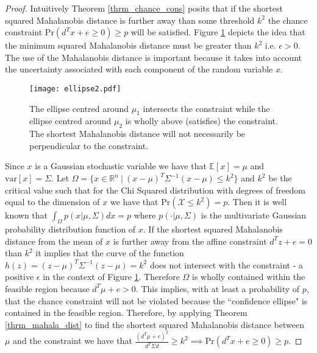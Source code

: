 \begin{proof}
Intuitively Theorem \ref{thrm_chance_cons} posits that if the shortest squared Mahalanobis distance is further away than some threshold $k^2$ the chance constraint $\text{Pr}(d^Tx + e \geq 0) \geq p$ will be satisfied. Figure \ref{fig_mahala_ellipse} depicts the idea that the minimum squared Mahalanobis distance must be greater than $k^2$ i.e. $\epsilon > 0$. The use of the Mahalanobis distance is important because it takes into account the uncertainty associated with each component of the random variable $x$.  
\begin{figure}[H] 
\centering
\texttt{[image: ellipse2.pdf]}
\caption{The ellipse centred around $\mu_1$ intersects the constraint while the ellipse centred around $\mu_2$ is wholly above (satisfies) the constraint. The shortest Mahalanobis distance will not necessarily be perpendicular to the constraint.}
\label{fig_mahala_ellipse}
\end{figure}
Since $x$ is a Gaussian stochastic variable we have that $\mathbb{E}[x] =\mu$ and $\text{var}[x]=\Sigma$. Let $\Omega = \{x \in \mathbb{R}^n~|~(x-\mu)^T\Sigma^{-1}(x-\mu) \leq k^2\}$ and $k^2$ be the critical value such that for the Chi Squared distribution with degrees of freedom equal to the dimension of $x$ we have that $\text{Pr}(\mathcal{X} \leq k^2) = p$. Then it is well known \cite{mahala2} that $\int_{\Omega}p(x|\mu, \Sigma)dx = p$ where $p(\cdot|\mu, \Sigma)$ is the multivariate Gaussian probability distribution function of $x$. If the shortest squared Mahalanobis distance from the mean of $x$ is further away from the affine constraint $d^Tz+e=0$ than $k^2$ it implies that the curve of the function $h(z) = (z-\mu)^T\Sigma^{-1}(z-\mu) = k^2$ does not intersect with the constraint - a positive $\epsilon$ in the context of Figure \ref{fig_mahala_ellipse}. Therefore $\Omega$ is wholly contained within the feasible region because $d^T\mu+e> 0 $. This implies, with at least a probability of $p$, that the chance constraint will not be violated because the ``confidence ellipse" is contained in the feasible region. Therefore, by applying Theorem \ref{thrm_mahala_dist} to find the shortest squared Mahalanobis distance between $\mu$ and the constraint we have that $\frac{(d^T\mu+e)^2}{d^T \Sigma d} \geq k^2 \implies \text{Pr}(d^Tx + e \geq 0) \geq p$.


\end{proof}
